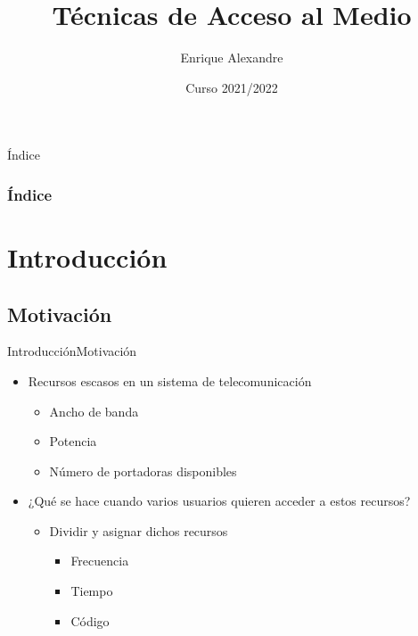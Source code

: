 \documentclass[10pt,compress]{beamer} %
\title[Técnicas de Acceso al Medio]{Técnicas de Acceso al Medio}
\author{Enrique Alexandre}
\institute{Dpto. de Teoría de la Señal y Comunicaciones}
\date{Curso 2021/2022}
\begin{document}
{\titlepageBlue
    \begin{frame}
        \titlepage
    \end{frame}
}

{
\begin{frame}[shrink]{Índice}
 \frametitle{Índice}
 \tableofcontents
\end{frame}
}

\section{Introducción}

\subsection{Motivación}

\begin{frame}{Introducción}{Motivación}
    \begin{itemize}
		\item Recursos escasos en un sistema de telecomunicación
		\begin{itemize}
			\item Ancho de banda
      \item Potencia
      \item Número de portadoras disponibles
		\end{itemize}
    \item ¿Qué se hace cuando varios usuarios quieren acceder a estos recursos?
    \begin{itemize}
			\item Dividir y asignar dichos recursos
      \begin{itemize}
        \item Frecuencia
        \item Tiempo
        \item Código
      \end{itemize}
		\end{itemize}
	\end{itemize}
\end{frame}
\end{document}
